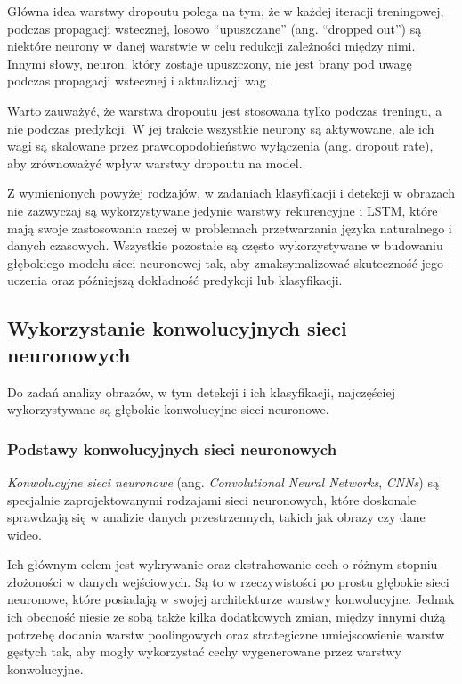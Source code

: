 \begin{itemize}
        Główna idea warstwy dropoutu polega na tym, że w każdej iteracji treningowej, podczas propagacji wstecznej, losowo ``upuszczane'' (ang. ``dropped out'') są niektóre neurony w danej warstwie w celu redukcji zależności między nimi.
        Innymi słowy, neuron, który zostaje upuszczony, nie jest brany pod uwagę podczas propagacji wstecznej i aktualizacji wag \cite{srivastava2014dropout}.

        Warto zauważyć, że warstwa dropoutu jest stosowana tylko podczas treningu, a nie podczas predykcji.
        W jej trakcie wszystkie neurony są aktywowane, ale ich wagi są skalowane przez prawdopodobieństwo wyłączenia (ang. dropout rate), aby zrównoważyć wpływ warstwy dropoutu na model.

\end{itemize}

Z wymienionych powyżej rodzajów, w zadaniach klasyfikacji i detekcji w obrazach nie zazwyczaj są wykorzystywane jedynie warstwy rekurencyjne i LSTM, które mają swoje zastosowania raczej w problemach przetwarzania języka naturalnego i danych czasowych.
Wszystkie pozostałe są często wykorzystywane w budowaniu głębokiego modelu sieci neuronowej tak, aby zmaksymalizować skuteczność jego uczenia oraz późniejszą dokładność predykcji lub klasyfikacji.

\subsection{Wykorzystanie konwolucyjnych sieci neuronowych}

Do zadań analizy obrazów, w tym detekcji i ich klasyfikacji, najczęściej wykorzystywane są głębokie konwolucyjne sieci neuronowe.

\subsubsection{Podstawy konwolucyjnych sieci neuronowych}

\emph{Konwolucyjne sieci neuronowe} (ang. \emph{Convolutional Neural Networks}, \emph{CNNs}) są specjalnie zaprojektowanymi rodzajami sieci neuronowych, które doskonale sprawdzają się w analizie danych przestrzennych, takich jak obrazy czy dane wideo.

Ich głównym celem jest wykrywanie oraz ekstrahowanie cech o różnym stopniu złożoności w danych wejściowych.
Są to w rzeczywistości po prostu głębokie sieci neuronowe, które posiadają w swojej architekturze warstwy konwolucyjne.
Jednak ich obecność niesie ze sobą także kilka dodatkowych zmian, między innymi dużą potrzebę dodania warstw poolingowych oraz strategiczne umiejscowienie warstw gęstych tak, aby mogły wykorzystać cechy wygenerowane przez warstwy konwolucyjne.

